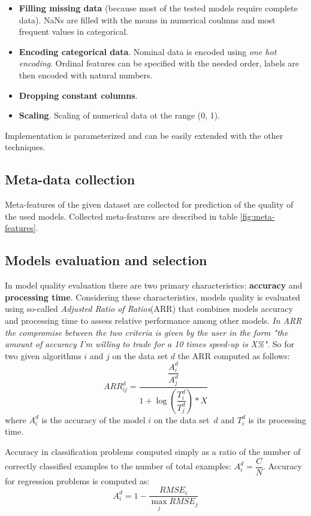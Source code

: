 \documentclass[hidelinks, english]{mvi-report}
\begin{document}
\begin{itemize}
    \item \textbf{Filling missing data} (because most of the tested models require complete data). NaNs are filled with
    the means in numerical coulmns and most frequent values in categorical.
    \item \textbf{Encoding categorical data}. Nominal data is encoded using \textit{one hot encoding}. Ordinal features
    can be specified with the needed order, labels are then encoded with natural numbers.
    \item \textbf{Dropping constant columns}.
    \item \textbf{Scaling}. Scaling of numerical data ot the range (0, 1).
\end{itemize}

Implementation is parameterized and can be easily extended with the other techniques.

\subsection{Meta-data collection}

Meta-features of the given dataset are collected for prediction of the quality of the used models. Collected
meta-features are described in table \ref{fig:meta-features}.


\subsection{Models evaluation and selection}
In model quality evaluation there are two primary characteristics: \textbf{accuracy} and \textbf{processing time}.
Considering these characteristics, models quality is evaluated using so-called \textit{Adjusted Ratio of Ratios}(ARR)
that combines models accuracy and processing time to assess relative performance among other models. \textit{In ARR
the compromise between the two criteria is given by the user in the form "the amount of accuracy I'm willing to trade for
a 10 times speed-up is X\%"}\cite{sampling-based-relative-landmarks}. So for two given algorithms $i$ and $j$ on
the data set $d$ the ARR computed as follows:
$$ ARR^d_{ij} = \dfrac{\dfrac{A^d_i}{A^d_j}}{1+\log{(\dfrac{T^d_i}{T^d_j})}*X} $$
where $A^d_i$ is the accuracy of the model $i$ on the data set~$d$ and $T^d_i$ is its processing time.

Accuracy in classification problems computed simply as a ratio of the number of correctly classified examples to
the number of total examples: $ A^d_i = \dfrac{C}{N} $. Accuracy for regression problems is computed as:
$$ A^d_i = 1 - \dfrac{RMSE_i}{\max_{j}RMSE_j} $$
\end{document}
